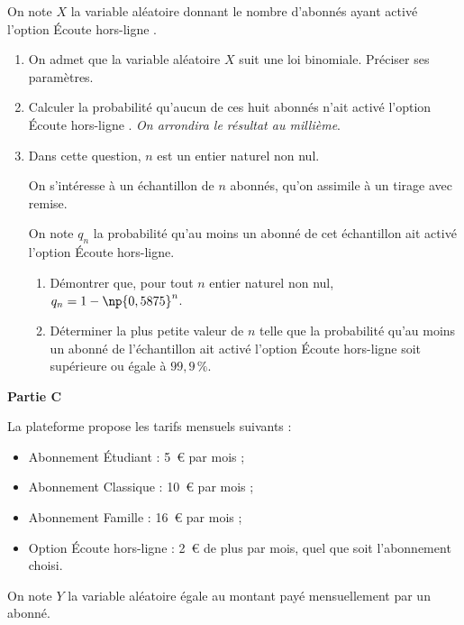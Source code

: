 \bigskip

On note $X$ la variable aléatoire donnant le nombre d'abonnés ayant activé l'option \og Écoute hors-ligne \fg{}.

\begin{enumerate}
\item On admet que la variable aléatoire $X$ suit une loi binomiale. Préciser ses paramètres.
\item Calculer la probabilité qu'aucun de ces huit abonnés n'ait activé l'option \og Écoute hors-ligne \fg{}. \emph{On arrondira le résultat au millième}.
\item Dans cette question, $n$ est un entier naturel non nul.

On s'intéresse à un échantillon de $n$ abonnés, qu'on assimile à un tirage avec remise.

On note $q_{n}$ la probabilité qu'au moins un abonné de cet échantillon ait activé l'option \og Écoute hors-ligne\fg{}.

	\begin{enumerate}
		\item Démontrer que, pour tout $n$ entier naturel non nul,\quad $q_{n}=1- \np{0,5875}^{n}$.
		\item Déterminer la plus petite valeur de $n$ telle que la probabilité qu'au moins un abonné de l'échantillon ait activé l'option \og Écoute hors-ligne\fg{} soit supérieure ou égale à $99,9\,\%$.
	\end{enumerate}
\end{enumerate}

\textbf{Partie C}

La plateforme propose les tarifs mensuels suivants :

\begin{itemize}
\item Abonnement \og Étudiant\fg{} : 5~\euro{} par mois ;
\item Abonnement \og Classique\fg{} : 10~\euro{} par mois ;
\item Abonnement \og Famille \fg{} : 16~\euro{} par mois ;
\item Option \og Écoute hors-ligne\fg{} : 2~\euro{} de plus par mois, quel que soit l'abonnement choisi.
\end{itemize}

On note $Y$ la variable aléatoire égale au montant payé mensuellement par un abonné.

